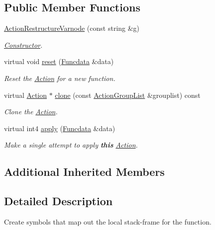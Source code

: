 \subsection*{Public Member Functions}
\begin{DoxyCompactItemize}
\item 
\mbox{\hyperlink{class_action_restructure_varnode_a3a01a62b2d1e74cc2b55c5fb89d2609a}{Action\+Restructure\+Varnode}} (const string \&g)
\begin{DoxyCompactList}\small\item\em \mbox{\hyperlink{class_constructor}{Constructor}}. \end{DoxyCompactList}\item 
virtual void \mbox{\hyperlink{class_action_restructure_varnode_a3dbf44512743482b15794628d8dc40af}{reset}} (\mbox{\hyperlink{class_funcdata}{Funcdata}} \&data)
\begin{DoxyCompactList}\small\item\em Reset the \mbox{\hyperlink{class_action}{Action}} for a new function. \end{DoxyCompactList}\item 
virtual \mbox{\hyperlink{class_action}{Action}} $\ast$ \mbox{\hyperlink{class_action_restructure_varnode_ad29015bf18989dac6349662f96aa469f}{clone}} (const \mbox{\hyperlink{class_action_group_list}{Action\+Group\+List}} \&grouplist) const
\begin{DoxyCompactList}\small\item\em Clone the \mbox{\hyperlink{class_action}{Action}}. \end{DoxyCompactList}\item 
virtual int4 \mbox{\hyperlink{class_action_restructure_varnode_ae2fc4e8dada82bfc532f072aebeb1a73}{apply}} (\mbox{\hyperlink{class_funcdata}{Funcdata}} \&data)
\begin{DoxyCompactList}\small\item\em Make a single attempt to apply {\bfseries{this}} \mbox{\hyperlink{class_action}{Action}}. \end{DoxyCompactList}\end{DoxyCompactItemize}
\subsection*{Additional Inherited Members}


\subsection{Detailed Description}
Create symbols that map out the local stack-\/frame for the function. 

